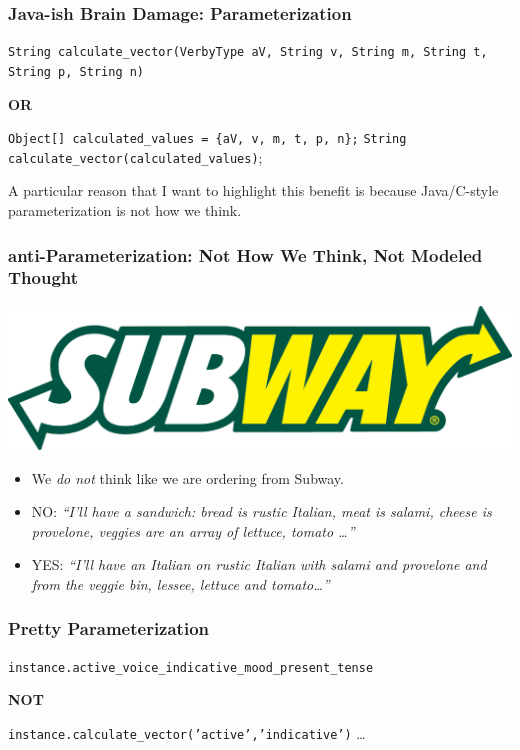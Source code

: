 \documentclass[slidestop,compress,mathserif]{beamer}
\begin{document}
\begin{frame}
	\frametitle{Java-ish Brain Damage:  Parameterization}
 	\texttt{String calculate\_vector(VerbyType aV, String v, String m, String t, String p, String n)}
	\vskip 0.5cm

	\begin{center}
		\textbf{OR}
	\end{center}

	\vskip 0.5cm
	\texttt{Object[] calculated\_values = \{aV, v, m, t, p, n\};}
	\texttt{String calculate\_vector(calculated\_values)};
\end{frame}
\note
{A particular reason that I want to highlight this benefit is because Java/C-style
parameterization is not how we think.
}

\begin{frame}
	\frametitle{anti-Parameterization:  Not How We Think, Not Modeled Thought}

		\begin{center}
			\includegraphics[scale=0.15]{img/SubwayLogo.png}
		\end{center}

	\begin{itemize}
		\item We \emph{do not} think like we are ordering from Subway.
		\pause
		\item NO:  \emph{``I'll have a sandwich:  bread is rustic Italian, meat is salami, cheese is provelone, veggies are an array of lettuce, tomato \ldots''}
		\pause
		\item YES:  \emph{``I'll have an Italian on rustic Italian with salami and provelone and from the veggie bin, lessee, lettuce and tomato\ldots''}
	\end{itemize}

\end{frame}

\begin{frame}
	\frametitle{Pretty Parameterization}
	\texttt{instance.active\_voice\_indicative\_mood\_present\_tense}
	\begin{center}
		\textbf{NOT}
	\end{center}
	\texttt{instance.calculate\_vector('active','indicative')} \ldots
\end{frame}
\end{document}
